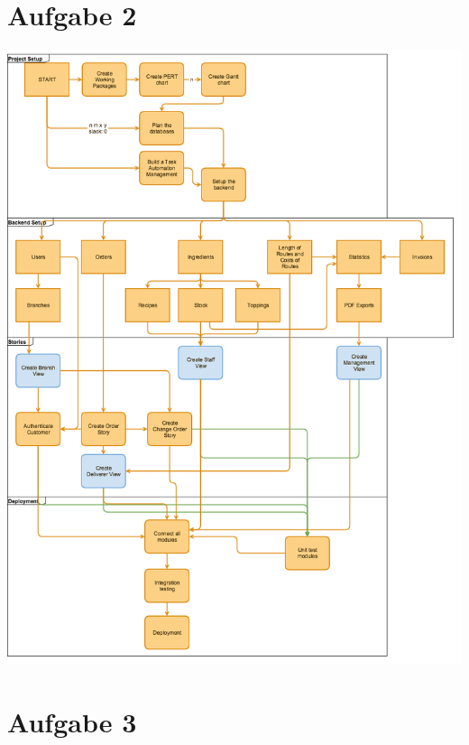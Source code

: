 \documentclass[a4paper]{report}
\begin{document}
\section*{Aufgabe 2}
        \includegraphics[width=14cm]{./diagramm.png}  

\newpage
\section*{Aufgabe 3}
\end{document}
